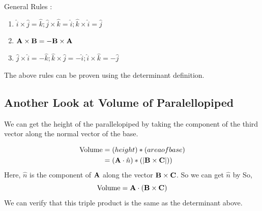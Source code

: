 General Rules :
\begin{enumerate}
    \item $\hat{i} \times \hat{j} = \hat{k}; \hat{j} \times \hat{k} = \hat{i}; \hat{k} \times \hat{i} = \hat{j}$ 
    \item ${\bf A} \times {\bf B} = - {\bf B} \times {\bf A}$
    \item $\hat{j} \times \hat{i} = - \hat{k}; \hat{k} \times \hat{j} = - \hat{i}; \hat{i} \times \hat{k} = - \hat{j}$  
\end{enumerate}

The above rules can be proven using the determinant definition.

\subsection{Another Look at Volume of Paralellopiped}

We can get the height of the parallelopiped by taking the component of the third vector along the normal vector of the base.

\begin{align*}
\text{Volume} &= (height) * (area of base) \\
    & = ({\bf A} \cdot \hat{n}) * (|{\bf B} \times {\bf C}|) )
\end{align*}
Here, $\hat{n}$ is the component of ${\bf A}$ along the vector ${\bf B} \times {\bf C}$.
So we can get $\hat{n}$ by 
So, $$ \text{Volume} =  {\bf A} \cdot ({\bf B} \times {\bf C}) $$
We can verify that this triple product is the same as the determinant above.